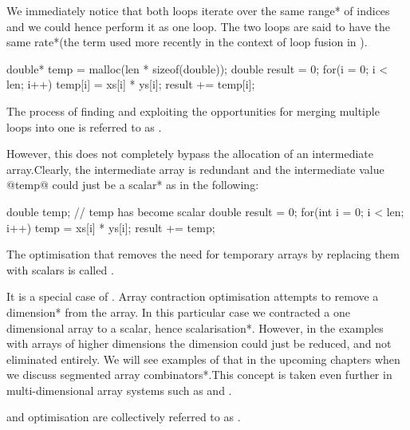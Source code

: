 \documentclass[preamble.tex]{subfiles}
\begin{document}
We immediately notice that both loops iterate over the same \*range* of indices and we could hence perform it as one loop. The two loops are said to have the same \*rate*\irate (the term used more recently in the context of loop fusion in \Haskell \cite{BenLippmeier:2014jc}).


\begin{ccode}
double* temp = malloc(len * sizeof(double));
double result = 0;
for(i = 0; i < len; i++) {
	temp[i] = xs[i] * ys[i];
	result += temp[i];
}
\end{ccode}


\begin{bluebox}
The process of finding and exploiting the opportunities for merging multiple loops into one is referred to as .\ifusion
\end{bluebox}


However, this does not completely bypass the allocation of an intermediate array.\iintermediate Clearly, the intermediate array is redundant and the intermediate value @temp@ could just be a \*scalar* as in the following:


\begin{ccode}
double temp; // temp has become scalar
double result = 0;
for(int i = 0; i < len; i++) {
	temp = xs[i] * ys[i];
	result += temp;
}
\end{ccode}


\begin{bluebox}
The optimisation that removes the need for temporary arrays by replacing them with scalars is called .
\end{bluebox}


It is a special case of . Array contraction optimisation attempts to remove a \*dimension* from the array. In this particular case we contracted a one dimensional array to a scalar, hence \*scalarisation*. However, in the examples with arrays of higher dimensions the dimension could just be reduced, and not eliminated entirely. We will see examples of that in the upcoming chapters when we discuss \*segmented array combinators*.\isegcomb This concept is taken even further in multi-dimensional array systems such as  \cite{KCL+10} and  \cite{CKL+11}.


\begin{bluebox}
 and  optimisation are collectively referred to as .
\end{bluebox}
\end{document}
